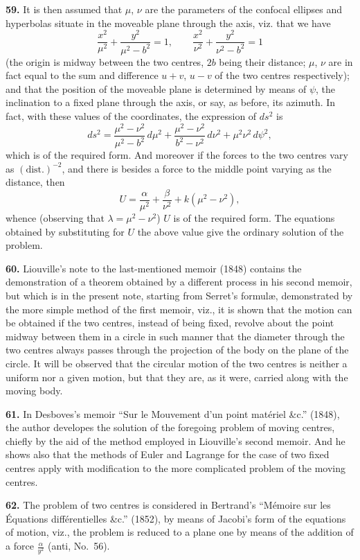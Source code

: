 \documentclass[11pt,a4paper]{book}
\begin{document}
\textbf{59.} It is then assumed that $\mu$, $\nu$ are the parameters of the confocal ellipses and hyperbolas situate in the moveable plane through the axis, viz. that we have
\[
\frac{x^2}{\mu^2} + \frac{y^2}{\mu^2 - b^2} = 1, \qquad \frac{x^2}{\nu^2} + \frac{y^2}{\nu^2 - b^2} = 1
\]
(the origin is midway between the two centres, $2b$ being their distance; $\mu$, $\nu$ are in fact equal to the sum and difference $u+v$, $u-v$ of the two centres respectively); and that the position of the moveable plane is determined by means of $\psi$, the inclination to a fixed plane through the axis, or say, as before, its azimuth. In fact, with these values of the coordinates, the expression of $ds^2$ is
\[
ds^2 = \frac{\mu^2 - \nu^2}{\mu^2 - b^2} \, d\mu^2 + \frac{\mu^2 - \nu^2}{b^2 - \nu^2} \, d\nu^2 + \mu^2\nu^2 \, d\psi^2,
\]
which is of the required form. And moreover if the forces to the two centres vary as $(\text{dist.})^{-2}$, and there is besides a force to the middle point varying as the distance, then
\[
U = \frac{\alpha}{\mu^2} + \frac{\beta}{\nu^2} + k(\mu^2 - \nu^2),
\]
whence (observing that $\lambda = \mu^2 - \nu^2$) $U$ is of the required form. The equations obtained by substituting for $U$ the above value give the ordinary solution of the problem.

\textbf{60.} Liouville's note to the last-mentioned memoir (1848) contains the demonstration of a theorem obtained by a different process in his second memoir, but which is in the present note, starting from Serret's formul\ae, demonstrated by the more simple method of the first memoir, viz., it is shown that the motion can be obtained if the two centres, instead of being fixed, revolve about the point midway between them in a circle in such manner that the diameter through the two centres always passes through the projection of the body on the plane of the circle. It will be observed that the circular motion of the two centres is neither a uniform nor a given motion, but that they are, as it were, carried along with the moving body.

\textbf{61.} In Desboves's memoir ``Sur le Mouvement d'un point mat\'eriel \&c.'' (1848), the author developes the solution of the foregoing problem of moving centres, chiefly by the aid of the method employed in Liouville's second memoir. And he shows also that the methods of Euler and Lagrange for the case of two fixed centres apply with modification to the more complicated problem of the moving centres.

\textbf{62.} The problem of two centres is considered in Bertrand's ``M\'emoire sur les \'Equations diff\'erentielles \&c.'' (1852), by means of Jacobi's form of the equations of motion, viz., the problem is reduced to a plane one by means of the addition of a force $\frac{\alpha}{y^2}$ (anti, No.~56).
\end{document}
